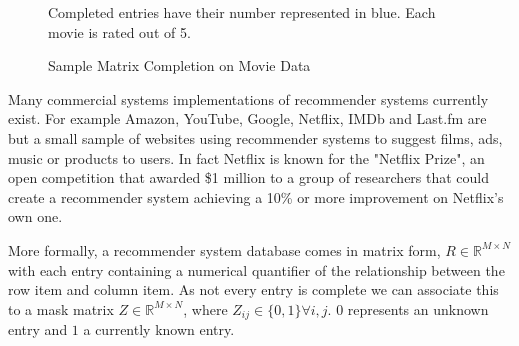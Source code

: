 \begin{figure}[!htbp]
\begin{center}
\end{center}
Completed entries have their number represented in blue. Each movie is rated out of 5.
    \caption{Sample Matrix Completion on Movie Data}
    \label{MatrixComp}
  
\end{figure}

Many commercial systems implementations of recommender systems currently exist. For example Amazon, YouTube, Google, Netflix, IMDb and Last.fm are but a small sample of websites using recommender systems to suggest films, ads, music or products to users. In fact Netflix is known for the "Netflix Prize", an open competition that awarded \$1 million to a group of researchers that could create a recommender system achieving a 10\% or more improvement on Netflix's own one.

More formally, a recommender system database comes in matrix form, $R \in \mathbb{R}^{M \times N}$ with each entry containing a numerical quantifier of the relationship between the row item and column item. As not every entry is complete we can associate this to a mask matrix $Z \in \mathbb{R}^{M \times N}$, where $Z_{ij} \in \{0,1\} \forall i,j$. $0$ represents an unknown entry and $1$ a currently known entry.





